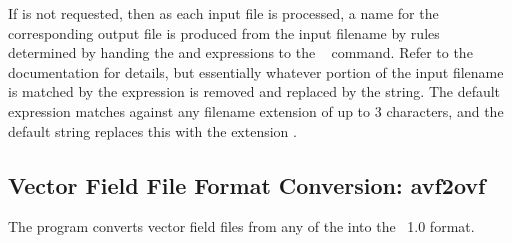 If  is not requested, then as each input file is
processed, a name for the corresponding output file is produced from
the input filename by rules determined by handing the 
and  expressions to the \Tcl\  command.  Refer
to the \Tcl\  documentation for details, but essentially
whatever portion of the input filename is matched by the 
expression is removed and replaced by the  string.  The
default  expression matches against any filename
extension of up to 3 characters, and the default  string
replaces this with the extension .


\subsection{Vector Field File Format Conversion:
          avf2ovf}\label{sec:avf2ovf}%
%
The  program converts vector field files from any of the
 into the \OVF\ 1.0 format.

